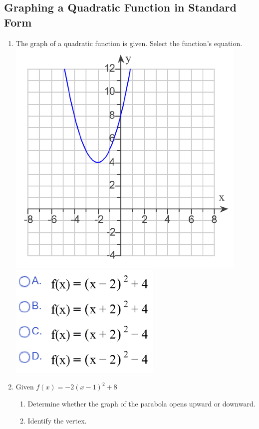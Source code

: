 \newpage


\subsection{Graphing a Quadratic Function in Standard Form}

\begin{enumerate}
\item The graph of a quadratic function is given.  Select the function's equation.\\
\includegraphics[scale=.7]{quad1a}\includegraphics[scale=.7]{quad1b}\\
\item Given $f(x)=-2(x-1)^2+8$
\begin{enumerate}
\item Determine whether the graph of the parabola opens upward or downward.\\[.3in]
\item Identify the vertex.\\[.3in]

\end{enumerate}
\end{enumerate}
